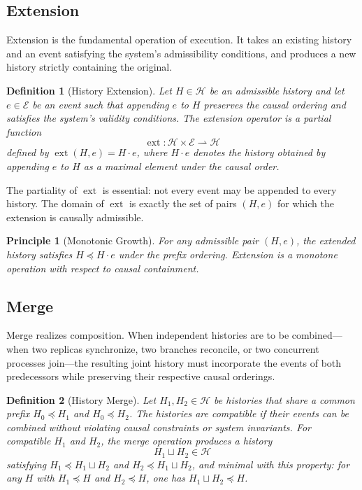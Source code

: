 \documentclass[12pt]{article}
\newtheorem{definition}{Definition}
\newtheorem{principle}{Principle}
\begin{document}
\subsection{Extension}

Extension is the fundamental operation of execution. It takes an existing history and an event
satisfying the system's admissibility conditions, and produces a new history strictly containing
the original.

\begin{definition}[History Extension]
Let $H \in \mathcal{H}$ be an admissible history and let $e \in \mathcal{E}$ be an event such
that appending $e$ to $H$ preserves the causal ordering and satisfies the system's validity
conditions. The \emph{extension operator} is a partial function
\[
\operatorname{ext} : \mathcal{H} \times \mathcal{E} \rightharpoonup \mathcal{H}
\]
defined by $\operatorname{ext}(H, e) = H \cdot e$, where $H \cdot e$ denotes the history
obtained by appending $e$ to $H$ as a maximal element under the causal order.
\end{definition}

The partiality of $\operatorname{ext}$ is essential: not every event may be appended to every
history. The domain of $\operatorname{ext}$ is exactly the set of pairs $(H, e)$ for which the
extension is causally admissible.

\begin{principle}[Monotonic Growth]
For any admissible pair $(H, e)$, the extended history satisfies $H \preceq H \cdot e$ under
the prefix ordering. Extension is a monotone operation with respect to causal containment.
\end{principle}

\subsection{Merge}

Merge realizes composition. When independent histories are to be combined---when two replicas
synchronize, two branches reconcile, or two concurrent processes join---the resulting joint
history must incorporate the events of both predecessors while preserving their respective
causal orderings.

\begin{definition}[History Merge]
Let $H_1, H_2 \in \mathcal{H}$ be histories that share a common prefix $H_0 \preceq H_1$ and
$H_0 \preceq H_2$. The histories are \emph{compatible} if their events can be combined without
violating causal constraints or system invariants. For compatible $H_1$ and $H_2$, the
\emph{merge operation} produces a history
\[
H_1 \sqcup H_2 \in \mathcal{H}
\]
satisfying $H_1 \preceq H_1 \sqcup H_2$ and $H_2 \preceq H_1 \sqcup H_2$, and minimal with
this property: for any $H$ with $H_1 \preceq H$ and $H_2 \preceq H$, one has
$H_1 \sqcup H_2 \preceq H$.
\end{definition}
\end{document}
